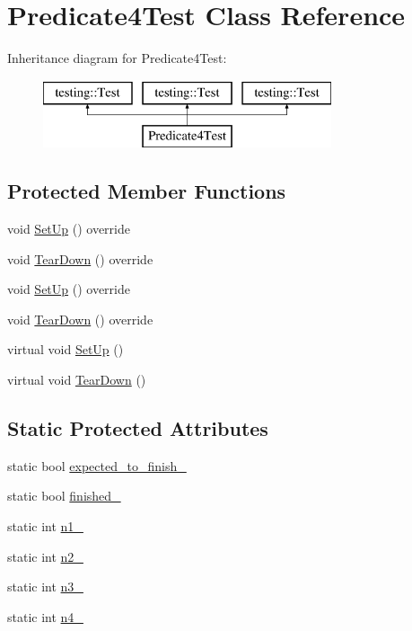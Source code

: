 \hypertarget{class_predicate4_test}{}\section{Predicate4\+Test Class Reference}
\label{class_predicate4_test}
Inheritance diagram for Predicate4\+Test\+:\begin{figure}[H]
\begin{center}
\leavevmode
\includegraphics[height=2.000000cm]{dc/d59/class_predicate4_test}
\end{center}
\end{figure}
\subsection*{Protected Member Functions}
\begin{DoxyCompactItemize}
\item 
void \mbox{\hyperlink{class_predicate4_test_ac27e833a2c7b3f889a01ad0a5bde18c6}{Set\+Up}} () override
\item 
void \mbox{\hyperlink{class_predicate4_test_ad1af4f8c283659c3af2c52a62de3435d}{Tear\+Down}} () override
\item 
void \mbox{\hyperlink{class_predicate4_test_ac27e833a2c7b3f889a01ad0a5bde18c6}{Set\+Up}} () override
\item 
void \mbox{\hyperlink{class_predicate4_test_ad1af4f8c283659c3af2c52a62de3435d}{Tear\+Down}} () override
\item 
virtual void \mbox{\hyperlink{class_predicate4_test_afcf9db5dc68e97291813cdfeb2aaa5d2}{Set\+Up}} ()
\item 
virtual void \mbox{\hyperlink{class_predicate4_test_ab61983a4cdf3657b02bc2b81b67729c4}{Tear\+Down}} ()
\end{DoxyCompactItemize}
\subsection*{Static Protected Attributes}
\begin{DoxyCompactItemize}
\item 
static bool \mbox{\hyperlink{class_predicate4_test_a20600b5eda187c42ce4e812e77269654}{expected\+\_\+to\+\_\+finish\+\_\+}}
\item 
static bool \mbox{\hyperlink{class_predicate4_test_acfd174bf9dfb5a91afbcdca17e797888}{finished\+\_\+}}
\item 
static int \mbox{\hyperlink{class_predicate4_test_a8eb30cd283e613f7a2e501a3969be9ae}{n1\+\_\+}}
\item 
static int \mbox{\hyperlink{class_predicate4_test_a088fce743c747e3851c926cb3a87fda3}{n2\+\_\+}}
\item 
static int \mbox{\hyperlink{class_predicate4_test_a00ae6ae54c7d6639d448c036aedb6114}{n3\+\_\+}}
\item 
static int \mbox{\hyperlink{class_predicate4_test_ae42e23ce11e3f1c6b813496d6180cc67}{n4\+\_\+}}
\end{DoxyCompactItemize}
